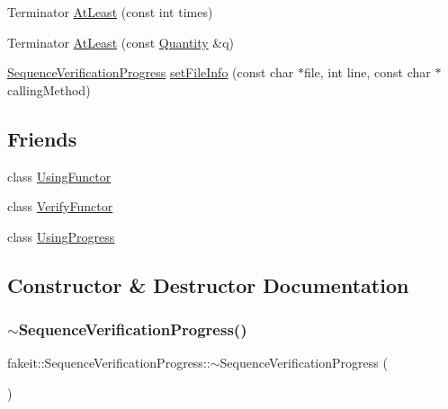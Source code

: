 \begin{DoxyCompactItemize}
\item 
Terminator \mbox{\hyperlink{classfakeit_1_1SequenceVerificationProgress_a83ba8d481bb79dad783f9bc821dd650e}{At\+Least}} (const int times)
\item 
Terminator \mbox{\hyperlink{classfakeit_1_1SequenceVerificationProgress_a1f6e949249d3f8119e920f6df6f7ade2}{At\+Least}} (const \mbox{\hyperlink{structfakeit_1_1Quantity}{Quantity}} \&q)
\item 
\mbox{\hyperlink{classfakeit_1_1SequenceVerificationProgress}{Sequence\+Verification\+Progress}} \mbox{\hyperlink{classfakeit_1_1SequenceVerificationProgress_aeeadb72fd4e0f52c06fa28c6b54d8188}{set\+File\+Info}} (const char $\ast$file, int line, const char $\ast$calling\+Method)
\end{DoxyCompactItemize}
\subsection*{Friends}
\begin{DoxyCompactItemize}
\item 
class \mbox{\hyperlink{classfakeit_1_1SequenceVerificationProgress_a41a12b43254178c219b93bd818bffabd}{Using\+Functor}}
\item 
class \mbox{\hyperlink{classfakeit_1_1SequenceVerificationProgress_a2a01b098d4a5791a5a03c1a440b1f20a}{Verify\+Functor}}
\item 
class \mbox{\hyperlink{classfakeit_1_1SequenceVerificationProgress_ae3800a95408d01063726713e29fcd4b1}{Using\+Progress}}
\end{DoxyCompactItemize}


\subsection{Constructor \& Destructor Documentation}
\mbox{\label{classfakeit_1_1SequenceVerificationProgress_a2c3325aa3d50002ef448d31e21494f76}} 
\subsubsection{\texorpdfstring{$\sim$SequenceVerificationProgress()}{~SequenceVerificationProgress()}\hspace{0.1cm}{\footnotesize\ttfamily [1/9]}}
{\footnotesize\ttfamily fakeit\+::\+Sequence\+Verification\+Progress\+::$\sim$\+Sequence\+Verification\+Progress (\begin{DoxyParamCaption}{ }\end{DoxyParamCaption})\hspace{0.3cm}{\ttfamily [inline]}}

